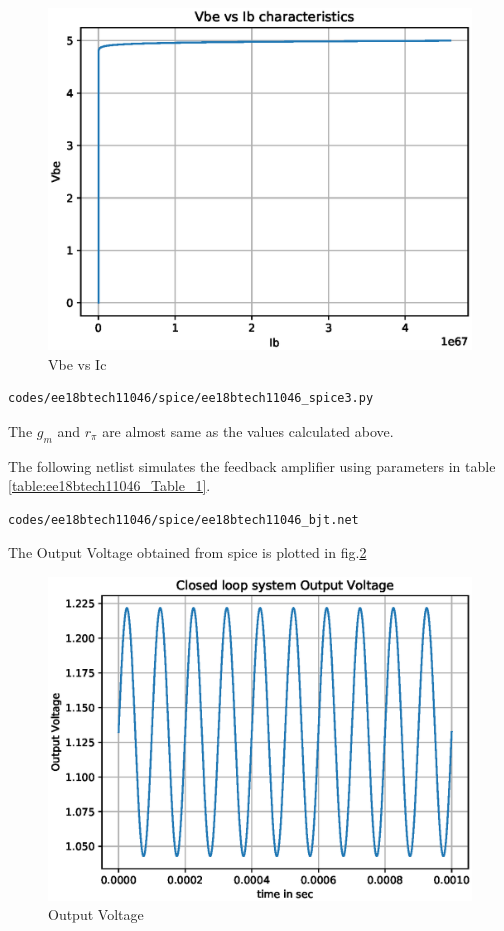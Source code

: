 \begin{enumerate}[label=\arabic*.,ref=\theenumi]
%
\begin{figure}[!ht]
\centering
\includegraphics[width=\columnwidth]{./figs/ee18btech11046/ee18btech11046_3.eps}
\caption{Vbe vs Ic}
\label{fig:ee18btech11046_spice3}
\end{figure}
%

\begin{lstlisting}
codes/ee18btech11046/spice/ee18btech11046_spice3.py
\end{lstlisting}

The $g_{m}$ and $r_{\pi}$ are almost same as the values calculated above.

The following netlist simulates the feedback amplifier using parameters in table \ref{table:ee18btech11046_Table_1}.
\begin{lstlisting}
codes/ee18btech11046/spice/ee18btech11046_bjt.net
\end{lstlisting}

The Output Voltage obtained from spice is plotted in fig.\ref{fig:ee18btech11046_spice1}
%
\begin{figure}[!ht]
\centering
\includegraphics[width=\columnwidth]{./figs/ee18btech11046/ee18btech11046_1.eps}
\caption{Output Voltage}
\label{fig:ee18btech11046_spice1}
\end{figure}
%


\end{enumerate}

